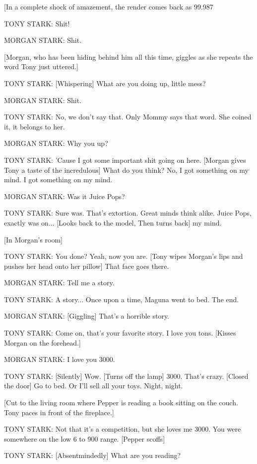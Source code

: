 [In a complete shock of amazement, the render comes back as 99.987%

TONY STARK: Shit!

MORGAN STARK: Shit.

[Morgan, who has been hiding behind him all this time, giggles as she repeats the word Tony just uttered.]

TONY STARK: [Whispering] What are you doing up, little mess?

MORGAN STARK: Shit.

TONY STARK: No, we don't say that. Only Mommy says that word. She coined it, it belongs to her.

MORGAN STARK: Why you up?

TONY STARK: 'Cause I got some important shit going on here. [Morgan gives Tony a taste of the incredulous] What do you think? No, I got something on my mind. I got something on my mind.

MORGAN STARK: Was it Juice Pops?

TONY STARK: Sure was. That's extortion. Great minds think alike. Juice Pops, exactly was on... [Looks back to the model, Then turns back] my mind.

[In Morgan's room]

TONY STARK: You done? Yeah, now you are. [Tony wipes Morgan's lips and pushes her head onto her pillow] That face goes there.

MORGAN STARK: Tell me a story.

TONY STARK: A story... Once upon a time, Maguna went to bed. The end.

MORGAN STARK: [Giggling] That's a horrible story.

TONY STARK: Come on, that's your favorite story. I love you tons. [Kisses Morgan on the forehead.]

MORGAN STARK: I love you 3000.

TONY STARK: [Silently] Wow. [Turns off the lamp] 3000. That's crazy. [Closed the door] Go to bed. Or I'll sell all your toys. Night, night.

[Cut to the living room where Pepper is reading a book sitting on the couch. Tony paces in front of the fireplace.]

TONY STARK: Not that it's a competition, but she loves me 3000. You were somewhere on the low 6 to 900 range. [Pepper scoffs]

TONY STARK: [Absentmindedly] What are you reading?

